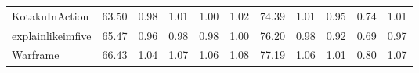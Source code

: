 \begin{tabular}{lrrrrrrrrrr}
KotakuInAction      &          63.50 &                0.98 &                1.01 &                1.00 &                1.02 &                 74.39 &                       1.01 &                       0.95 &                       0.74 &                       1.01 \\
explainlikeimfive   &          65.47 &                0.96 &                0.98 &                0.98 &                1.00 &                 76.20 &                       0.98 &                       0.92 &                       0.69 &                       0.97 \\
Warframe            &          66.43 &                1.04 &                1.07 &                1.06 &                1.08 &                 77.19 &                       1.06 &                       1.01 &                       0.80 &                       1.07 \\
\bottomrule
\end{tabular}

